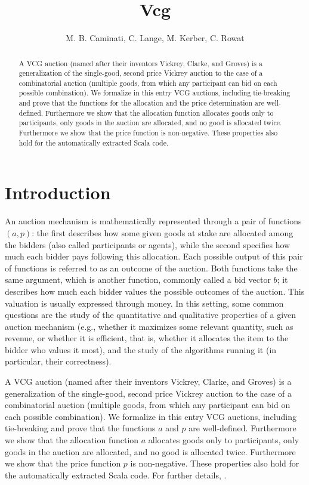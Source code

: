\documentclass[11pt,a4paper]{article}
\begin{document}
\title{Vcg}
\author{M. B. Caminati, C. Lange, M. Kerber, C. Rowat}
\maketitle

\begin{abstract}
A VCG auction (named after their inventors Vickrey, Clarke, and
Groves) is a generalization of the single-good, second price Vickrey
auction to the case of a combinatorial auction (multiple goods, from
which any participant can bid on each possible combination). We
formalize in this entry VCG auctions, including tie-breaking and prove
that the functions for the allocation and the price determination are
well-defined. Furthermore we show that the allocation function
allocates goods only to participants, only goods in the auction are
allocated, and no good is allocated twice. Furthermore we show that
the price function is non-negative. These properties also hold for the
automatically extracted Scala code.
\end{abstract}




\tableofcontents

\section{Introduction}
An auction mechanism is mathematically represented through a pair of
functions $(a, p)$: the first describes how some given goods at stake
are allocated among the bidders (also called participants or agents),
while the second specifies how much each bidder pays following this
allocation.  Each possible output of this pair of functions is
referred to as an outcome of the auction. Both functions take the same
argument, which is another function, commonly called a bid vector $b$;
it describes how much each bidder values the possible outcomes of the
auction. This valuation is usually expressed through money.  In this
setting, some common questions are the study of the quantitative and
qualitative properties of a given auction mechanism (e.g., whether it
maximizes some relevant quantity, such as revenue, or whether it is
efficient, that is, whether it allocates the item to the bidder who
values it most), and the study of the algorithms running it (in
particular, their correctness).

A VCG auction (named after their inventors Vickrey, Clarke, and
Groves) is a generalization of the single-good, second price Vickrey
auction to the case of a combinatorial auction (multiple goods, from
which any participant can bid on each possible combination). We
formalize in this entry VCG auctions, including tie-breaking and prove
that the functions $a$ and $p$ are well-defined. Furthermore we show that
the allocation function $a$ allocates goods only to participants, only
goods in the auction are allocated, and no good is allocated
twice. Furthermore we show that the price function $p$ is
non-negative. These properties also hold for the automatically
extracted Scala code. For further details, \cite{ec15}.
\end{document}

